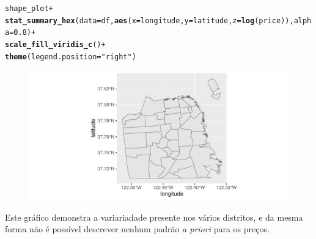 \documentclass[justified, 11pt]{scrartcl}\usepackage[]{graphicx}\usepackage[]{xcolor}
\makeatletter
\def\maxwidth{ %
  \ifdim\Gin@nat@width>\linewidth
    \linewidth
  \else
    \Gin@nat@width
  \fi
}
\newcommand{\hlnum}[1]{\textcolor[rgb]{0.686,0.059,0.569}{#1}}%
\newcommand{\hlstr}[1]{\textcolor[rgb]{0.192,0.494,0.8}{#1}}%
\newcommand{\hlopt}[1]{\textcolor[rgb]{0,0,0}{#1}}%
\newcommand{\hlstd}[1]{\textcolor[rgb]{0.345,0.345,0.345}{#1}}%
\newcommand{\hlkwc}[1]{\textcolor[rgb]{0.333,0.667,0.333}{#1}}%
\newcommand{\hlkwd}[1]{\textcolor[rgb]{0.737,0.353,0.396}{\textbf{#1}}}%
\newenvironment{kframe}{%
 \def\at@end@of@kframe{}%
 \ifinner\ifhmode%
  \def\at@end@of@kframe{\end{minipage}}%
  \begin{minipage}{\columnwidth}%
 \fi\fi%
 \def\FrameCommand##1{\hskip\@totalleftmargin \hskip-\fboxsep
 \colorbox{shadecolor}{##1}\hskip-\fboxsep
     \hskip-\linewidth \hskip-\@totalleftmargin \hskip\columnwidth}%
 \MakeFramed {\advance\hsize-\width
   \@totalleftmargin\z@ \linewidth\hsize
   \@setminipage}}%
 {\par\unskip\endMakeFramed%
 \at@end@of@kframe}
\newenvironment{knitrout}{}{} %
\makeatother
\begin{document}
\begin{knitrout}
\color{fgcolor}\begin{kframe}
\begin{alltt}
\hlstd{shape_plot} \hlopt{+}
  \hlkwd{stat_summary_hex}\hlstd{(}\hlkwc{data} \hlstd{= df,} \hlkwd{aes}\hlstd{(}\hlkwc{x}\hlstd{=longitude,} \hlkwc{y}\hlstd{=latitude,} \hlkwc{z}\hlstd{=} \hlkwd{log}\hlstd{(price)),} \hlkwc{alpha}\hlstd{=}\hlnum{0.8}\hlstd{)} \hlopt{+}
  \hlkwd{scale_fill_viridis_c}\hlstd{()} \hlopt{+}
  \hlkwd{theme}\hlstd{(}\hlkwc{legend.position} \hlstd{=} \hlstr{"right"}\hlstd{)}
\end{alltt}


{\ttfamily\noindent\color{warningcolor}{\#\# Warning: Removed 3 rows containing non-finite values (`stat\_summary\_hex()`).}}

{\ttfamily\noindent\color{warningcolor}{\#\# Warning: Computation failed in `stat\_summary\_hex()`\\\#\# Caused by error in `compute\_group()`:\\\#\# ! The package `hexbin` is required for `stat\_summary\_hex()`}}\end{kframe}\begin{figure}
\includegraphics[width=\maxwidth]{figure/chunk-priceHexes-1} \end{figure}

\end{knitrout}

Este gráfico demonstra a variariadade presente nos vários distritos, e da mesma forma não é possível descrever nenhum padrão \textit{a priori} para os preços. \\
\end{document}
